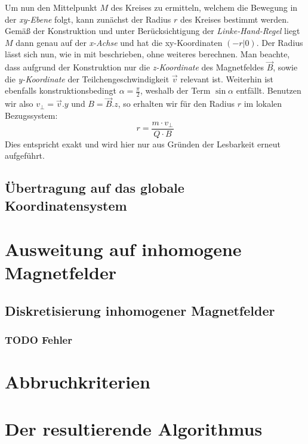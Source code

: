 Um nun den Mittelpunkt \(M\) des Kreises zu ermitteln, welchem die Bewegung in der \textit{xy-Ebene} folgt, kann zun\"achst der
Radius \(r\) des Kreises bestimmt werden. Gem\"a{\ss} der Konstruktion und unter Ber\"ucksichtigung der \textit{Linke-Hand-Regel}
liegt \(M\) dann genau auf der \textit{x-Achse} und hat die xy-Koordinaten \(\left(-r| 0 \right)\). Der Radius l\"asst sich nun,
wie in  mit  beschrieben, ohne weiteres berechnen. Man beachte, dass aufgrund der
Konstruktion nur die \textit{z-Koordinate} des Magnetfeldes \(\vec{B}\), sowie die \textit{y-Koordinate} der Teilchengeschwindigkeit
\(\vec{v}\) relevant ist. Weiterhin ist ebenfalls konstruktionsbedingt \(\alpha = \frac{\pi}{2}\), weshalb der Term \(\sin{\alpha}\)
entf\"allt. Benutzen wir also \(v_\perp = \vec{v}.y\) und \(B = \vec{B}.z\), so erhalten wir f\"ur den Radius \(r\) im lokalen
Bezugssystem:
\begin{equation*}
  r = \frac{m \cdot v_\perp}{Q \cdot B}
\end{equation*}
Dies entspricht exakt  und wird hier nur aus Gr\"unden der Lesbarkeit erneut aufgef\"uhrt.

\subsection{\"Ubertragung auf das globale Koordinatensystem}

\section{Ausweitung auf inhomogene Magnetfelder}

\subsection{Diskretisierung inhomogener Magnetfelder}

\subsubsection{TODO Fehler}

\section{Abbruchkriterien}

\section{Der resultierende Algorithmus}
